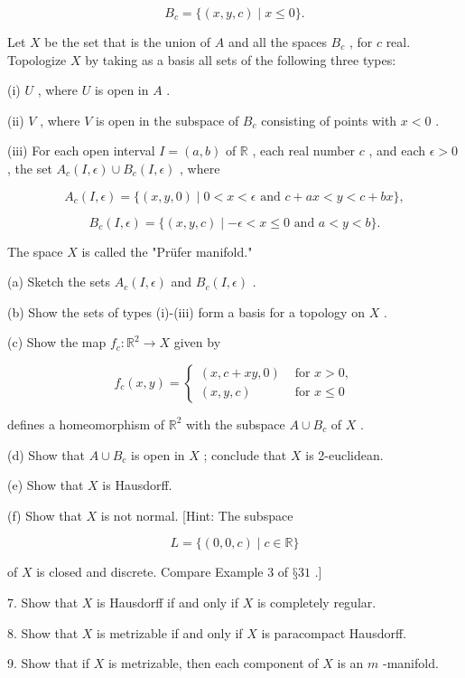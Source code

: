\[
{B}_{c} = \{ \left( {x,y,c}\right)  \mid  x \leq  0\} .
\]

Let \(X\) be the set that is the union of \(A\) and all the spaces \({B}_{c}\) , for \(c\) real. Topologize \(X\) by taking as a basis all sets of the following three types:

(i) \(U\) , where \(U\) is open in \(A\) .

(ii) \(V\) , where \(V\) is open in the subspace of \({B}_{c}\) consisting of points with \(x < 0\) .

(iii) For each open interval \(I = \left( {a,b}\right)\) of \(\mathbb{R}\) , each real number \(c\) , and each \(\epsilon  > 0\) , the set \({A}_{c}\left( {I,\epsilon }\right)  \cup  {B}_{c}\left( {I,\epsilon }\right)\) , where

\[
{A}_{c}\left( {I,\epsilon }\right)  = \{ \left( {x,y,0}\right)  \mid  0 < x < \epsilon \text{ and }c + {ax} < y < c + {bx}\} ,
\]

\[
{B}_{c}\left( {I,\epsilon }\right)  = \{ \left( {x,y,c}\right)  \mid   - \epsilon  < x \leq  0\text{ and }a < y < b\} .
\]

The space \(X\) is called the "Prüfer manifold."

(a) Sketch the sets \({A}_{c}\left( {I,\epsilon }\right)\) and \({B}_{c}\left( {I,\epsilon }\right)\) .

(b) Show the sets of types (i)-(iii) form a basis for a topology on \(X\) .

(c) Show the map \({f}_{c} : {\mathbb{R}}^{2} \rightarrow  X\) given by

\[
{f}_{c}\left( {x,y}\right)  = \left\{  \begin{array}{ll} \left( {x,c + {xy},0}\right) & \text{ for }x > 0, \\  \left( {x,y,c}\right) & \text{ for }x \leq  0 \end{array}\right.
\]

defines a homeomorphism of \({\mathbb{R}}^{2}\) with the subspace \(A \cup  {B}_{c}\) of \(X\) .

(d) Show that \(A \cup  {B}_{c}\) is open in \(X\) ; conclude that \(X\) is 2-euclidean.

(e) Show that \(X\) is Hausdorff.

(f) Show that \(X\) is not normal. [Hint: The subspace

\[
L = \{ \left( {0,0,c}\right)  \mid  c \in  \mathbb{R}\}
\]

of \(X\) is closed and discrete. Compare Example 3 of \(§{31}\) .]

7. Show that \(X\) is Hausdorff if and only if \(X\) is completely regular.

8. Show that \(X\) is metrizable if and only if \(X\) is paracompact Hausdorff.

9. Show that if \(X\) is metrizable, then each component of \(X\) is an \(m\) -manifold.